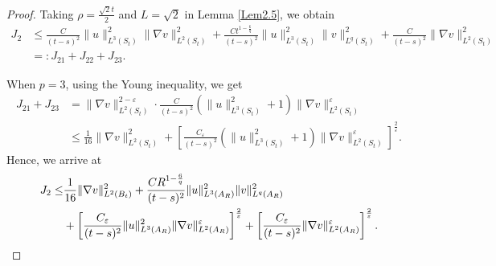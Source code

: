 \documentclass[11pt,reqno]{amsart}
\numberwithin{Thm}{section}
\begin{document}
\begin{proof}
Taking $\rho=\frac{\sqrt{2}t}{2}$ and $L=\sqrt{2}$ in Lemma \ref{Lem2.5}, we obtain
\begin{align*}
 J_2&\leq\frac{C}{(t-s)^2}\|u\|_{L^3(S_t)}^2\|\nabla v\|_{L^2(S_t)}^2+\frac{Ct^{1-\frac{6}{q}}}{(t-s)^2}\|u\|_{L^3(S_t)}^2\|v\|_{L^q(S_t)}^2+\frac{C}{(t-s)^2}\|\nabla v\|_{L^2(S_t)}^2\\
 &=:J_{21}+J_{22}+J_{23}.
\end{align*}

When $p=3$, using the Young inequality, we get
\begin{align*}
J_{21}+J_{23}&=\|\nabla v\|_{L^2(S_t)}^{2-\varepsilon}\cdot\frac{C}{(t-s)^2}\left(\|u\|_{L^3(S_t)}^2+1\right)\|\nabla v\|_{L^2(S_t)}^\varepsilon\\
&\leq\frac{1}{16}\|\nabla v\|_{L^2(S_t)}^2+\left[\frac{C_\varepsilon}{(t-s)^2}\left(\|u\|_{L^3(S_t)}^2+ 1\right)\|\nabla v\|_{L^2(S_t)}^\varepsilon\right]^\frac{2}{\varepsilon}.
\end{align*}
Hence, we arrive at
\begin{align}
J_2\leq&\frac{1}{16}\|\nabla v\|_{L^2(B_t)}^2+\frac{CR^{1-\frac{6}{q}}}{(t-s)^2}\|u\|_{L^3(A_R)}^2\|v\|_{L^q(A_R)}^2\notag\\
&+\left[\frac{C_\varepsilon}{(t-s)^2}\|u\|_{L^3(A_R)}^2\|\nabla v\|_{L^2(A_R)}^\varepsilon\right]^\frac{2}{\varepsilon}+\left[\frac{C_\varepsilon}{(t-s)^2}\|\nabla v\|_{L^2(A_R)}^\varepsilon\right]^\frac{2}{\varepsilon}.\label{ine3.15}
\end{align}



\end{proof}
\end{document}
